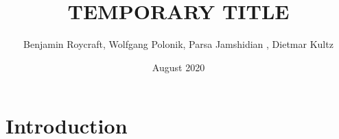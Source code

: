 \documentclass{article}
\title{TEMPORARY TITLE}
\author{Benjamin Roycraft, Wolfgang Polonik, Parsa Jamshidian , Dietmar Kultz}
\date{August 2020}
\begin{document}
\maketitle

\section{Introduction}
\end{document}

